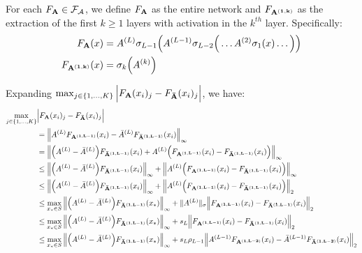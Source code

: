 \noindent For each $F_{\bf A}\in\mathcal{F}_\mathcal{A}$, we define $F_{\bf A}$ as the entire network and $F_{\bf A^{(1, k)}}$ as the extraction of the first $k\ge 1$ layers with activation in the $k^{th}$ layer. Specifically:
\begin{align*}
    F_{\bf A}(x) &= A^{(L)}\sigma_{L-1}\Big( A^{(L-1)}\sigma_{L-2}\Big(  \dots A^{(2)}\sigma_1(x) \dots \Big) \Big) \\   
    F_{\bf A^{(1, k)}}(x) &= \sigma_k\Big( 
        A^{(k)}
     \Big)
\end{align*}

\noindent Expanding $\max_{j\in\{1, \dots, K\}}\Big| F_{\bf A}(x_i)_j - F_{\bf \bar A}(x_i)_j \Big|$, we have:
\begin{align*}
    \max_{j\in\{1, \dots, K\}}&\Big|  F_{\bf A}(x_i)_j - F_{\bf \bar A}(x_i)_j  \Big| \\
        &=  \Big\|
            A^{(L)}F_{\bf A^{(1, L-1)}}(x_i) - {\bar A}^{(L)}F_{\bf {\bar A}^{(1, L-1)}}(x_i)
        \Big\|_\infty \\
        &= \Big\|
            \Big( A^{(L)}-{\bar A}^{(L)} \Big)F_{\bf {\bar A}^{(1, L-1)}}(x_i) + A^{(L)}\Big( F_{\bf A^{(1, L-1)}}(x_i) - F_{\bf {\bar A}^{(1, L-1)}}(x_i) \Big)
        \Big\|_\infty \\
        &\le \Big\|
            \Big( A^{(L)}-{\bar A}^{(L)} \Big)F_{\bf {\bar A}^{(1, L-1)}}(x_i) 
        \Big\|_\infty
        + 
        \Big\|
            A^{(L)}\Big( F_{\bf A^{(1, L-1)}}(x_i) - F_{\bf {\bar A}^{(1, L-1)}}(x_i) \Big)
        \Big\|_\infty \\
        &\le \Big\|
            \Big( A^{(L)}-{\bar A}^{(L)} \Big)F_{\bf {\bar A}^{(1, L-1)}}(x_i) 
        \Big\|_\infty
        + 
        \Big\|
            A^{(L)}\Big( F_{\bf A^{(1, L-1)}}(x_i) - F_{\bf {\bar A}^{(1, L-1)}}(x_i) \Big)
        \Big\|_2 \\
        &\le \max_{x_*\in S}\Big\|
            \Big( A^{(L)}-{\bar A}^{(L)} \Big)F_{\bf {\bar A}^{(1, L-1)}}(x_*)
        \Big\|_\infty + \|A^{(L)}\|_\sigma\Big\|
            F_{\bf A^{(1, L-1)}}(x_i) - F_{\bf {\bar A}^{(1, L-1)}}(x_i)
        \Big\|_2 \\
        &\le \max_{x_*\in S}\Big\|
            \Big( A^{(L)}-{\bar A}^{(L)} \Big)F_{\bf {\bar A}^{(1, L-1)}}(x_*)
        \Big\|_\infty + s_L \Big\|
            F_{\bf A^{(1, L-1)}}(x_i) - F_{\bf {\bar A}^{(1, L-1)}}(x_i)
        \Big\|_2 \\
        &\le \max_{x_*\in S}\Big\|
            \Big( A^{(L)}-{\bar A}^{(L)} \Big)F_{\bf {\bar A}^{(1, L-1)}}(x_*)
        \Big\|_\infty + s_L\rho_{L-1} \Big\|
            A^{(L-1)}F_{\bf A^{(1, L-2)}}(x_i) - {\bar A}^{(L-1)}F_{\bf {\bar A}^{(1, L-2)}}(x_i) 
        \Big\|_2 \\
\end{align*}
